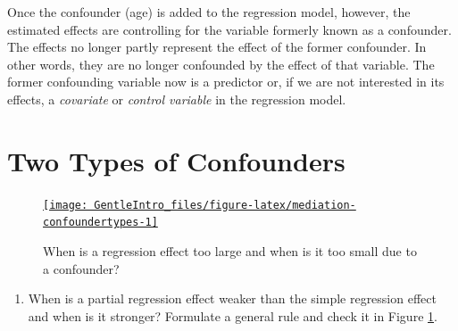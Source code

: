 \documentclass[a4paper]{book}
\providecommand{\tightlist}{%
  \setlength{\itemsep}{0pt}\setlength{\parskip}{0pt}}
\theoremstyle{definition}
\theoremstyle{definition}
\theoremstyle{definition}
\theoremstyle{remark}
\begin{document}
Once the confounder (age) is added to the regression model, however, the
estimated effects are controlling for the variable formerly known as a
confounder. The effects no longer partly represent the effect of the
former confounder. In other words, they are no longer confounded by the
effect of that variable. The former confounding variable now is a
predictor or, if we are not interested in its effects, a
\emph{covariate} or \emph{control variable} in the regression model.

\section{Two Types of Confounders}\label{confounders}

\begin{figure}[H]
\href{http://82.196.4.233:3838/apps/mediation-confoundertypes/}{\texttt{[image: GentleIntro\_files/figure-latex/mediation-confoundertypes-1]} }\caption{When is a regression effect too large and when is it too small due to a confounder?}\label{fig:mediation-confoundertypes}
\end{figure}

\begin{enumerate}
\def\labelenumi{\arabic{enumi}.}
\tightlist
\item
  When is a partial regression effect weaker than the simple regression
  effect and when is it stronger? Formulate a general rule and check it
  in Figure \ref{fig:mediation-confoundertypes}.
\end{enumerate}
\end{document}
